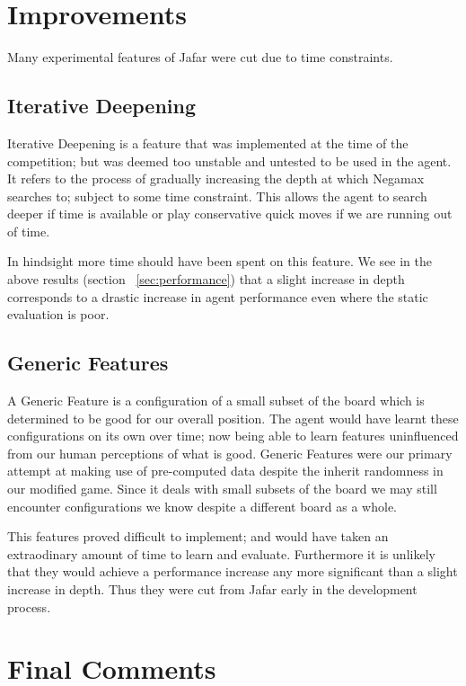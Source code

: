 \documentclass[11pt]{article}
\begin{document}
\section{Improvements}
\label{sec:improvements}
Many experimental features of Jafar were cut due to time constraints.

\subsection{Iterative Deepening}
\label{sub:i_deepening}

Iterative Deepening is a feature that was implemented at the time of the competition;
but was deemed too unstable and untested to be used in the agent.
It refers to the process of gradually increasing the depth at which Negamax searches to;
subject to some time constraint. This allows the agent to search deeper if
time is available or play conservative quick moves if we are running out of time.

In hindsight more time should have been spent on this feature. We see in the above results
(section ~\ref{sec:performance}) that a slight increase in depth corresponds to
a drastic increase in agent performance even where the static evaluation is poor.

\subsection{Generic Features}
\label{sub:generic_features}

A Generic Feature is a configuration of a small subset of the board which is
determined to be good for our overall position. The agent would have learnt these configurations
on its own over time; now being able to learn features uninfluenced from our human
perceptions of what is good.
Generic Features were our primary attempt at making use of pre-computed data despite
the inherit randomness in our modified game. Since it deals with small subsets of the
board we may still encounter configurations we know despite a different board as a whole.

This features proved difficult to implement; and would have taken an
extraodinary amount of time to learn and evaluate. Furthermore it is unlikely
that they would achieve a performance increase any more significant than a slight increase
in depth. Thus they were cut from Jafar
early in the development process.
\section{Final Comments}
\label{sec:final_comments}




\end{document}
